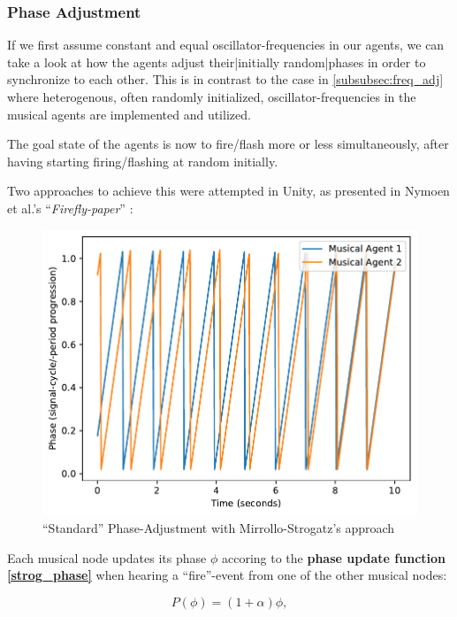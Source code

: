 		\subsubsection{Phase Adjustment}
		\label{subsubsec:phase_adj}
			If we first assume constant and equal oscillator-frequencies in our agents, we can take a look at how the agents adjust their|initially random|phases in order to synchronize to each other. This is in contrast to the case in \ref{subsubsec:freq_adj} where heterogenous, often randomly initialized, oscillator-frequencies in the musical agents are implemented and utilized.
			
			The goal state of the agents is now to fire/flash more or less simultaneously, after having starting firing/flashing at random initially.
			
			Two approaches to achieve this were attempted in Unity, as presented in Nymoen et al.'s ``\textit{Firefly-paper}'' \cite{nymoen_synch}:
			
			
			\begin{figure}[h]
				\centering
				\includegraphics[width=0.9\linewidth]{Assets/Figures/MirolloStrogatzPhaseAdjustment.pdf}
				\caption{``Standard'' Phase-Adjustment with Mirrollo-Strogatz's approach}
				\label{fig:strog_phase}
			\end{figure}
			
			Each musical node updates its phase $\phi$ accoring to the \textbf{phase update function \eqref{strog_phase}} when hearing a ``fire''-event from one of the other musical nodes:
			
			\begin{equation}\label{strog_phase}
			P(\phi) = (1 + \alpha)\phi	,
			\end{equation}
			
